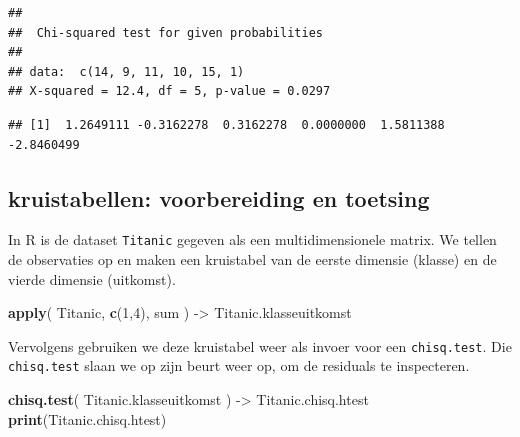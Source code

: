 \documentclass[
]{book}
\newenvironment{Shaded}{\begin{snugshade}}{\end{snugshade}}
\newcommand{\CommentTok}[1]{\textcolor[rgb]{0.56,0.35,0.01}{\textit{#1}}}
\newcommand{\DecValTok}[1]{\textcolor[rgb]{0.00,0.00,0.81}{#1}}
\newcommand{\KeywordTok}[1]{\textcolor[rgb]{0.13,0.29,0.53}{\textbf{#1}}}
\newcommand{\NormalTok}[1]{#1}
\newcommand{\OperatorTok}[1]{\textcolor[rgb]{0.81,0.36,0.00}{\textbf{#1}}}
\newcommand{\StringTok}[1]{\textcolor[rgb]{0.31,0.60,0.02}{#1}}
\begin{document}
\begin{verbatim}
## 
##  Chi-squared test for given probabilities
## 
## data:  c(14, 9, 11, 10, 15, 1)
## X-squared = 12.4, df = 5, p-value = 0.0297
\end{verbatim}

\begin{Shaded}
\end{Shaded}

\begin{verbatim}
## [1]  1.2649111 -0.3162278  0.3162278  0.0000000  1.5811388 -2.8460499
\end{verbatim}

\hypertarget{kruistabellen-voorbereiding-en-toetsing}{%
\subsection{kruistabellen: voorbereiding en toetsing}\label{kruistabellen-voorbereiding-en-toetsing}}

In R is de dataset \texttt{Titanic} gegeven als een multidimensionele matrix. We tellen de observaties op en maken een kruistabel van de eerste dimensie (klasse) en de vierde dimensie (uitkomst).

\begin{Shaded}
\begin{Highlighting}[]
\KeywordTok{apply}\NormalTok{( Titanic, }\KeywordTok{c}\NormalTok{(}\DecValTok{1}\NormalTok{,}\DecValTok{4}\NormalTok{), sum ) {-}\textgreater{}}\StringTok{ }\NormalTok{Titanic.klasseuitkomst}
\end{Highlighting}
\end{Shaded}

Vervolgens gebruiken we deze kruistabel weer als invoer voor een \texttt{chisq.test}. Die \texttt{chisq.test} slaan we op zijn beurt weer op, om de residuals te inspecteren.

\begin{Shaded}
\begin{Highlighting}[]
\KeywordTok{chisq.test}\NormalTok{( Titanic.klasseuitkomst ) {-}\textgreater{}}\StringTok{ }\NormalTok{Titanic.chisq.htest}
\KeywordTok{print}\NormalTok{(Titanic.chisq.htest)}
\end{Highlighting}
\end{Shaded}
\end{document}
